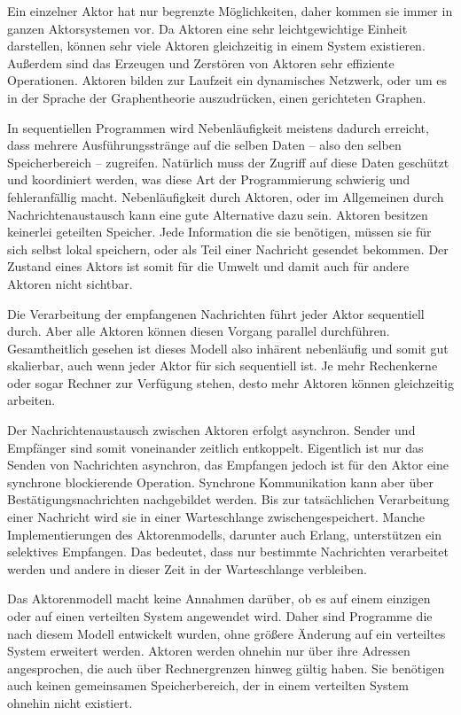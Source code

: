Ein einzelner Aktor hat nur begrenzte Möglichkeiten, daher kommen sie immer in ganzen Aktorsystemen vor. Da Aktoren eine sehr leichtgewichtige Einheit darstellen, können sehr viele Aktoren gleichzeitig in einem System existieren. Außerdem sind das Erzeugen und Zerstören von Aktoren sehr effiziente Operationen. Aktoren bilden zur Laufzeit ein dynamisches Netzwerk, oder um es in der Sprache der Graphentheorie auszudrücken, einen gerichteten Graphen.

In sequentiellen Programmen wird Nebenläufigkeit meistens dadurch erreicht, dass mehrere Ausführungsstränge auf die selben Daten -- also den selben Speicherbereich -- zugreifen. Natürlich muss der Zugriff auf diese Daten geschützt und koordiniert werden, was diese Art der Programmierung schwierig und fehleranfällig macht. Nebenläufigkeit durch Aktoren, oder im Allgemeinen durch Nachrichtenaustausch kann eine gute Alternative dazu sein. Aktoren besitzen keinerlei geteilten Speicher. Jede Information die sie benötigen, müssen sie für sich selbst lokal speichern, oder als Teil einer Nachricht gesendet bekommen. Der Zustand eines Aktors ist somit für die Umwelt und damit auch für andere Aktoren nicht sichtbar.

Die Verarbeitung der empfangenen Nachrichten führt jeder Aktor sequentiell durch. Aber alle Aktoren können diesen Vorgang parallel durchführen. Gesamtheitlich gesehen ist dieses Modell also inhärent nebenläufig und somit gut skalierbar, auch wenn jeder Aktor für sich sequentiell ist. Je mehr Rechenkerne oder sogar Rechner zur Verfügung stehen, desto mehr Aktoren können gleichzeitig arbeiten.

Der Nachrichtenaustausch zwischen Aktoren erfolgt asynchron. Sender und Empfänger sind somit voneinander zeitlich entkoppelt.  Eigentlich ist nur das Senden von Nachrichten asynchron, das Empfangen jedoch ist für den Aktor eine synchrone \bzw blockierende Operation. Synchrone Kommunikation kann aber über Bestätigungsnachrichten nachgebildet werden. Bis zur tatsächlichen Verarbeitung einer Nachricht wird sie in einer Warteschlange zwischengespeichert. Manche Implementierungen des Aktorenmodells, darunter auch Erlang, unterstützen ein selektives Empfangen. Das bedeutet, dass nur bestimmte Nachrichten verarbeitet werden und andere in dieser Zeit in der Warteschlange verbleiben.

Das Aktorenmodell macht keine Annahmen darüber, ob es auf einem einzigen oder auf einen verteilten System angewendet wird. Daher sind Programme die nach diesem Modell entwickelt wurden, ohne größere Änderung auf ein verteiltes System erweitert werden. Aktoren werden ohnehin nur über ihre Adressen angesprochen, die auch über Rechnergrenzen hinweg gültig haben. Sie benötigen auch keinen gemeinsamen Speicherbereich, der in einem verteilten System ohnehin nicht existiert.

